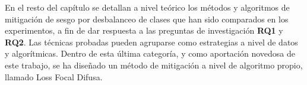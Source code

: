 En el resto del capítulo se detallan a nivel teórico los métodos y algoritmos de mitigación de sesgo por desbalanceo de clases que han sido comparados en los experimentos, a fin de dar respuesta a las preguntas de investigación \textbf{RQ1} y \textbf{RQ2}. Las técnicas probadas pueden agruparse como estrategias a nivel de datos y algorítmicas. Dentro de esta última categoría, y como aportación novedosa de este trabajo, se ha diseñado un método de mitigación a nivel de algoritmo propio, llamado Loss Focal Difusa. %